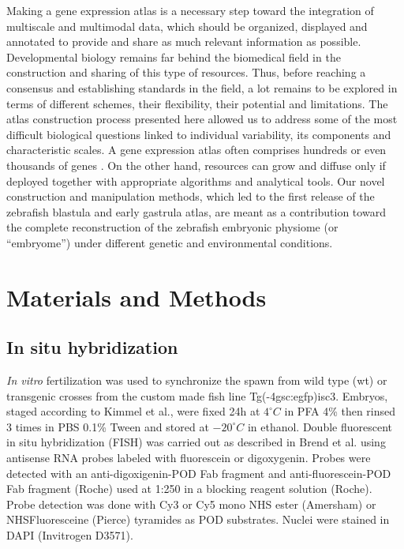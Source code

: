 Making a gene expression atlas is a necessary step toward the integration of multiscale and multimodal data, which should be organized, displayed and annotated to provide and share as much relevant information as possible. Developmental biology remains far behind the biomedical field in the construction and sharing of this type of resources. Thus, before reaching a consensus and establishing standards in the field, a lot remains to be explored in terms of different schemes, their flexibility, their potential and limitations. The atlas construction process presented here allowed us to address some of the most difficult biological questions linked to individual variability, its components and characteristic scales. A gene expression atlas often comprises hundreds or even thousands of genes \cite{de2009more}. On the other hand, resources can grow and diffuse only if deployed together with appropriate algorithms and analytical tools. Our novel construction and manipulation methods, which led to the first release of the zebrafish blastula and early gastrula atlas, are meant as a contribution toward the complete reconstruction of the zebrafish embryonic physiome (or ``embryome'') under different genetic and environmental conditions.






\section*{Materials and Methods}



\subsection*{In situ hybridization}

\label{subsec:imaging}



\emph{In vitro} fertilization was used to synchronize the spawn from wild type (wt) or transgenic crosses from the custom made fish line Tg(-4gsc:egfp)isc3. Embryos, staged according to Kimmel et al.\cite{kimmel1995stages}, were fixed 24h at $4^{\circ} C$ in PFA 4\% then rinsed 3 times in PBS 0.1\% Tween and stored at $-20^{\circ} C$ in ethanol. Double fluorescent in situ hybridization (FISH) was carried out as described in Brend et al.\cite{brend2009zebrafish} using antisense RNA probes labeled with fluorescein or digoxygenin. Probes were detected with an anti-digoxigenin-POD Fab fragment and anti-fluorescein-POD Fab fragment (Roche) used at 1:250 in a blocking reagent solution (Roche). Probe detection was done with Cy3 or Cy5 mono NHS ester (Amersham) or NHSFluoresceine (Pierce) tyramides as POD substrates. Nuclei were stained in DAPI (Invitrogen D3571).



